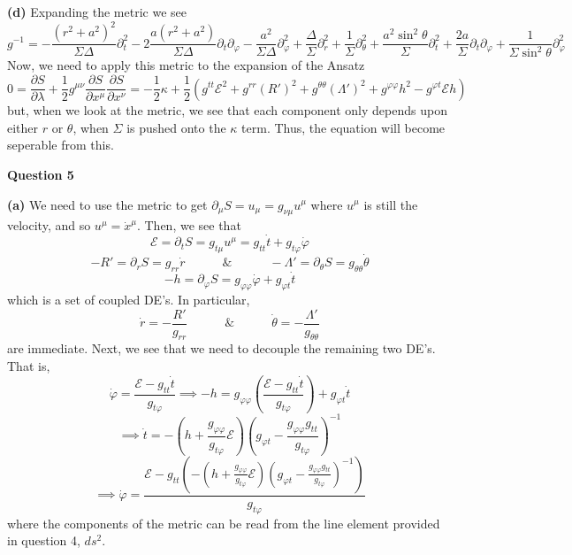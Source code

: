 \documentclass[10pt]{article}
\newcommand{\di}[2][]{\frac{\partial #1}{\partial #2}}
\begin{document}
\textbf{(d)} Expanding the metric we see
\[ g^{-1} = -\frac{(r^{2} + a^{2})^{2}}{\Sigma\Delta}\partial_{t}^{2} - 2\frac{a(r^{2} + a^{2})}{\Sigma\Delta}\partial_{t}\partial_{\varphi} - \frac{a^{2}}{\Sigma\Delta}\partial_{\varphi}^{2} + \frac{\Delta}{\Sigma}\partial_{r}^{2} + \frac{1}{\Sigma}\partial_{\theta}^{2} + \frac{a^{2}\sin^{2}\theta}{\Sigma}\partial_{t}^{2} + \frac{2a}{\Sigma}\partial_{t}\partial_{\varphi} + \frac{1}{\Sigma \sin^{2}\theta}\partial_{\varphi}^{2} \]
Now, we need to apply this metric to the expansion of the Ansatz
\[0 = \di[S]{\lambda} + \frac{1}{2}g^{\mu\nu}\di[S]{x^{\mu}}\di[S]{x^{\nu}} = -\frac{1}{2}\kappa + \frac{1}{2}\left(g^{tt}\mathcal{E}^{2} + g^{rr}(R')^{2} + g^{\theta\theta}(\Lambda')^{2} + g^{\varphi\varphi}h^{2} - g^{\varphi t}\mathcal{E}h\right) \]
but, when we look at the metric, we see that each component only depends upon either $r$ or $\theta$, when $\Sigma$ is pushed onto the $\kappa$ term. Thus, the equation will become seperable from this.

\newpage
\textbf{Question 5}

\textbf{(a)} We need to use the metric to get $\partial_{\mu}S = u_{\mu} = g_{\nu\mu}u^{\mu}$ where $u^{\mu}$ is still the velocity, and so $u^{\mu} = \dot{x}^{\mu}$. Then, we see that
\[ \mathcal{E} = \partial_{t}S = g_{t \mu}u^{\mu} = g_{tt}\dot{t} + g_{t\varphi}\dot{\varphi} \]
\[ -R' = \partial_{r}S = g_{rr}\dot{r} \hspace{3em} \& \hspace{3em} -\Lambda' = \partial_{\theta}S = g_{\theta\theta}\dot{\theta} \]
\[ -h = \partial_{\varphi}S = g_{\varphi\varphi}\dot{\varphi} + g_{\varphi t}\dot{t} \]
which is a set of coupled DE's. In particular,
\[ \dot{r} = -\frac{R'}{g_{rr}} \hspace{3em} \& \hspace{3em} \dot{\theta} = -\frac{\Lambda'}{g_{\theta\theta}} \]
are immediate. Next, we see that we need to decouple the remaining two DE's. That is,
\[\dot{\varphi} = \frac{\mathcal{E} - g_{tt}\dot{t}}{g_{t\varphi}} \implies -h = g_{\varphi\varphi}\left(\frac{\mathcal{E} - g_{tt}\dot{t}}{g_{t\varphi}}\right) + g_{\varphi t}\dot{t}\]
\[ \implies \dot{t} = -\left(h + \frac{g_{\varphi\varphi}}{g_{t\varphi}}\mathcal{E}\right)\left(g_{\varphi t} - \frac{g_{\varphi\varphi}g_{tt}}{g_{t\varphi}}\right)^{-1}\]
\[ \implies \dot{\varphi}= \frac{\mathcal{E} - g_{tt}\left(-\left(h + \frac{g_{\varphi\varphi}}{g_{t\varphi}}\mathcal{E}\right)\left(g_{\varphi t} - \frac{g_{\varphi\varphi}g_{tt}}{g_{t\varphi}}\right)^{-1}\right)}{g_{t\varphi}} \]
where the components of the metric can be read from the line element provided in question 4, $ds^{2}$.
\end{document}
